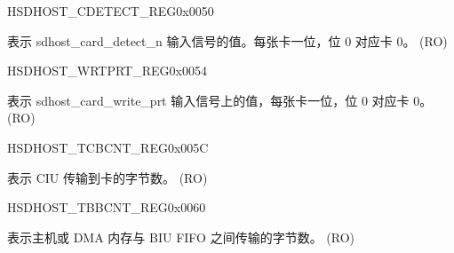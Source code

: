 \begin{register}{H}{SDHOST\_CDETECT\_REG}{0x0050}\label{regdesc:SDHOSTCDETECTREG}
%
%
\regnewline%
\begin{regdesc}\begin{reglist}
\label{fielddesc:SDHOSTCARDDETECTN}\item [SDHOST\_CARD\_DETECT\_N] 表示 sdhost\_card\_detect\_n 输入信号的值。每张卡一位，位 0 对应卡 0。 (RO)
\end{reglist}\end{regdesc}
\end{register}


\begin{register}{H}{SDHOST\_WRTPRT\_REG}{0x0054}\label{regdesc:SDHOSTWRTPRTREG}
%
%
\regnewline%
\begin{regdesc}\begin{reglist}
\label{fielddesc:SDHOSTWRITEPROTECT}\item [SDHOST\_WRITE\_PROTECT] 表示 sdhost\_card\_write\_prt 输入信号上的值，每张卡一位，位 0 对应卡 0。 (RO)
\end{reglist}\end{regdesc}
\end{register}


\begin{register}{H}{SDHOST\_TCBCNT\_REG}{0x005C}\label{regdesc:SDHOSTTCBCNTREG}
%
\regnewline%
\begin{regdesc}\begin{reglist}
\label{fielddesc:SDHOSTTCBCNTREG}\item [SDHOST\_TCBCNT\_REG] 表示 CIU 传输到卡的字节数。 (RO)
\end{reglist}\end{regdesc}
\end{register}


\begin{register}{H}{SDHOST\_TBBCNT\_REG}{0x0060}\label{regdesc:SDHOSTTBBCNTREG}
%
\regnewline%
\begin{regdesc}\begin{reglist}
\label{fielddesc:SDHOSTTBBCNTREG}\item [SDHOST\_TBBCNT\_REG] 表示主机或 DMA 内存与 BIU FIFO 之间传输的字节数。 (RO)
\end{reglist}\end{regdesc}
\end{register}


